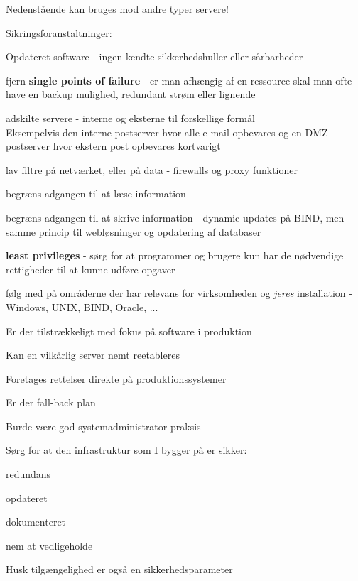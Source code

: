 \begin{list1}
  \item Nedenstående kan bruges mod andre typer servere!
\item Sikringsforanstaltninger:
  \begin{list2}
  \item Opdateret software - ingen kendte sikkerhedshuller eller
  sårbarheder
\item fjern {\bfseries single points of failure} - er man afhængig af
  en ressource skal man ofte have en backup mulighed, redundant strøm
  eller lignende
\item adskilte servere - interne og eksterne til forskellige formål\\
Eksempelvis den interne postserver hvor alle e-mail opbevares og en
DMZ-postserver hvor ekstern post opbevares kortvarigt
\item lav filtre på netværket, eller på data - firewalls og proxy
  funktioner 
\item begræns adgangen til at læse information
\item begræns adgangen til at skrive information - dynamic updates på
  BIND, men samme princip til webløsninger og opdatering af databaser
\item {\bfseries least privileges} - sørg for at programmer og brugere
  kun har de nødvendige rettigheder til at kunne udføre opgaver
\item følg med på områderne der har relevans for virksomheden og
  \emph{jeres} installation - Windows, UNIX, BIND, Oracle, ...
  \end{list2}
\end{list1}


\begin{list1}
\item Er der tilstrækkeligt med fokus på software i produktion
\item Kan en vilkårlig server nemt reetableres
\item Foretages rettelser direkte på produktionssystemer
\item Er der fall-back plan
\item Burde være god systemadministrator praksis
\end{list1}




\begin{list1}
\item Sørg for at den infrastruktur som I bygger på er sikker:
\begin{list2}
 \item redundans
       \item opdateret
        \item dokumenteret
        \item nem at vedligeholde
\end{list2}

\item  Husk tilgængelighed er også en sikkerhedsparameter
\end{list1}

